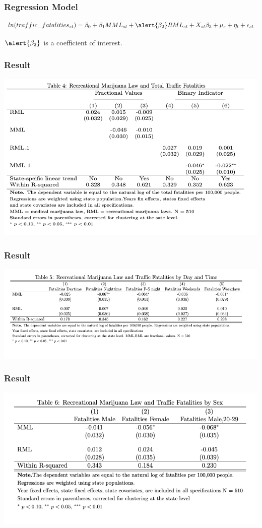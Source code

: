 \documentclass{beamer}
\begin{document}
\begin{frame}
\frametitle{Regression Model} %

$$ ln(traffic\_fatalities_{st}) = \beta_0 + \beta_1 MML_{st} + \alert{\beta_2} RML_{st} + X_{st} \beta_3 + \mu_s + \eta_t   +\epsilon_{st}$$

 $\alert{\beta_2}$  is a coefficient of interest. 

\end{frame}


\begin{frame} %
\frametitle{Result}
	
	\includegraphics[scale = 0.33]{table4}
	
\end{frame}

\begin{frame} %
\frametitle{Result}
	
	\includegraphics[scale = 0.33]{table5}
	
\end{frame}

\begin{frame} %
\frametitle{Result}
	
	\includegraphics[scale = 0.33]{table6}
	
\end{frame}
\end{document}
